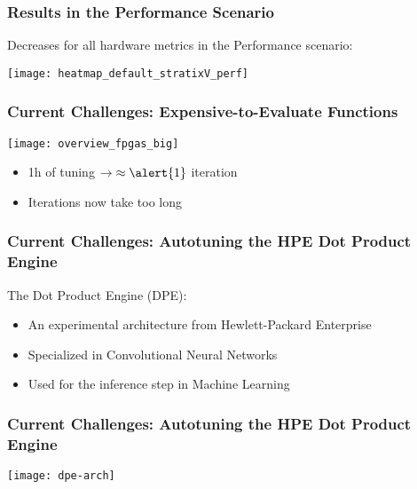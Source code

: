 \documentclass[10pt, compress, aspectratio=169, xcolor=table]{beamer}
\begin{document}
\begin{frame}
    \frametitle{Results in the Performance Scenario}
    Decreases for \alert{all hardware metrics}
    in the \alert{Performance} scenario:

    \begin{center}
        \texttt{[image: heatmap\_default\_stratixV\_perf]}
    \end{center}
\end{frame}

\begin{frame}
    \frametitle{Current Challenges: Expensive-to-Evaluate Functions}
    \begin{center}
        \texttt{[image: overview\_fpgas\_big]}
    \end{center}

    \vspace{.3cm}

    \begin{itemize}
        \item \alert{1h} of tuning $\rightarrow \; \approx \alert{1}$ \alert{iteration}
        \item Iterations now \alert{take too long}
    \end{itemize}
\end{frame}

\begin{frame}
    \frametitle{Current Challenges: Autotuning the HPE Dot Product Engine}
    The \alert{Dot Product Engine} (\alert{DPE}):

    \begin{itemize}
        \item An experimental architecture from \alert{Hewlett-Packard Enterprise}
        \item Specialized in \alert{Convolutional Neural Networks}
        \item Used for the \alert{inference step} in Machine Learning
    \end{itemize}
\end{frame}

\begin{frame}
    \frametitle{Current Challenges: Autotuning the HPE Dot Product Engine}
    \vspace{.4cm}

    \begin{center}
        \texttt{[image: dpe-arch]}
    \end{center}
\end{frame}
\end{document}
